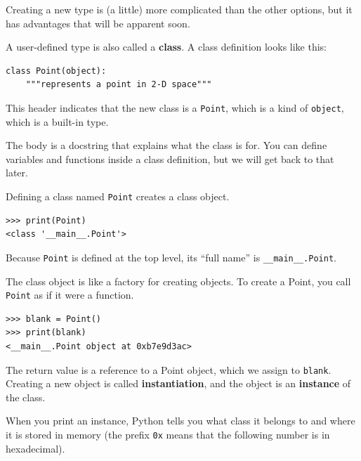 \documentclass[10pt]{book}
\begin{document}

Creating a new type
is (a little) more complicated than the other options, but
it has advantages that will be apparent soon.

A user-defined type is also called a {\bf class}.
A class definition looks like this:


\beforeverb
\begin{verbatim}
class Point(object):
    """represents a point in 2-D space"""
\end{verbatim}
\afterverb
%
This header indicates that the new class is a {\tt Point},
which is a kind of {\tt object}, which is a built-in
type.


The body is a docstring that explains what the class is for.
You can define variables and functions inside a class definition,
but we will get back to that later.


Defining a class named {\tt Point} creates a class object.

\beforeverb
\begin{verbatim}
>>> print(Point)
<class '__main__.Point'>
\end{verbatim}
\afterverb
%
Because {\tt Point} is defined at the top level, its ``full
name'' is \verb"__main__.Point".


The class object is like a factory for creating objects.  To create a
Point, you call {\tt Point} as if it were a function.

\beforeverb
\begin{verbatim}
>>> blank = Point()
>>> print(blank)
<__main__.Point object at 0xb7e9d3ac>
\end{verbatim}
\afterverb
%
The return value is a reference to a Point object, which we
assign to {\tt blank}.  
Creating a new object is called
{\bf instantiation}, and the object is an {\bf instance} of
the class.


When you print an instance, Python tells you what class it
belongs to and where it is stored in memory (the prefix
{\tt 0x} means that the following number is in hexadecimal).

\end{document}
